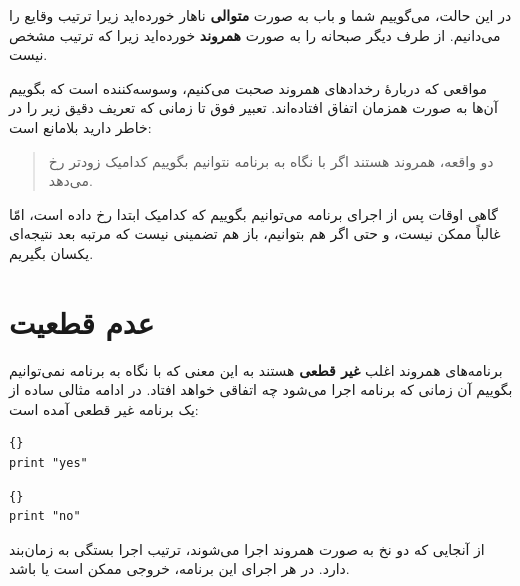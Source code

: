 \documentclass{book}
\begin{document}
    در این حالت، می‌گوییم شما و باب به صورت \textbf{متوالی} ناهار خورده‌اید زیرا 
    ترتیب وقایع را می‌دانیم. از طرف دیگر صبحانه را به صورت  \textbf{همروند} خورده‌اید 
    زیرا که ترتیب مشخص نیست. 
    
    مواقعی که دربارهٔ رخدادهای همروند صحبت می‌کنیم، 
    وسوسه‌کننده است که بگوییم آن‌ها به صورت همزمان اتفاق افتاده‌اند. 
    تعبیر فوق تا زمانی که تعریف دقیق زیر را در خاطر دارید بلامانع است:

\begin{quote}
    دو واقعه، همروند هستند اگر با نگاه به برنامه نتوانیم بگوییم کدامیک زودتر رخ می‌دهد. 
\end{quote}

    گاهی اوقات پس از اجرای برنامه می‌‌توانیم بگوییم که کدامیک ابتدا رخ داده است، امّا غالباً ممکن نیست، و حتی اگر هم بتوانیم، 
    باز هم تضمینی نیست که مرتبه بعد نتیجه‌ای یکسان بگیریم. 
\newpage
\section{عدم قطعیت}

    برنامه‌های همروند اغلب \textbf{غیر قطعی} هستند به این معنی که 
    با نگاه به برنامه نمی‌توانیم بگوییم آن زمانی که برنامه اجرا می‌شود چه اتفاقی خواهد افتاد. 
    در ادامه مثالی ساده از یک برنامه غیر قطعی آمده است:

\begin{latin}
\begin{minipage}[t]{2in}
\begin{latin}
\begin{lstlisting}[title=\rl{نخ \lr{A}}]{}
print "yes"
\end{lstlisting}
\end{latin}
\end{minipage}
\hfill
\begin{minipage}[t]{2in}
\begin{latin}
\begin{lstlisting}[title=\rl{نخ \lr{‌B}}]{}
print "no"
\end{lstlisting}
\end{latin}
\end{minipage}
\end{latin}

    از آنجایی که دو نخ به صورت همروند اجرا می‌شوند، ترتیب اجرا بستگی به زمان‌بند دارد. در هر اجرای این برنامه، خروجی ممکن است 
      یا 
     باشد. 
     
\end{document}
